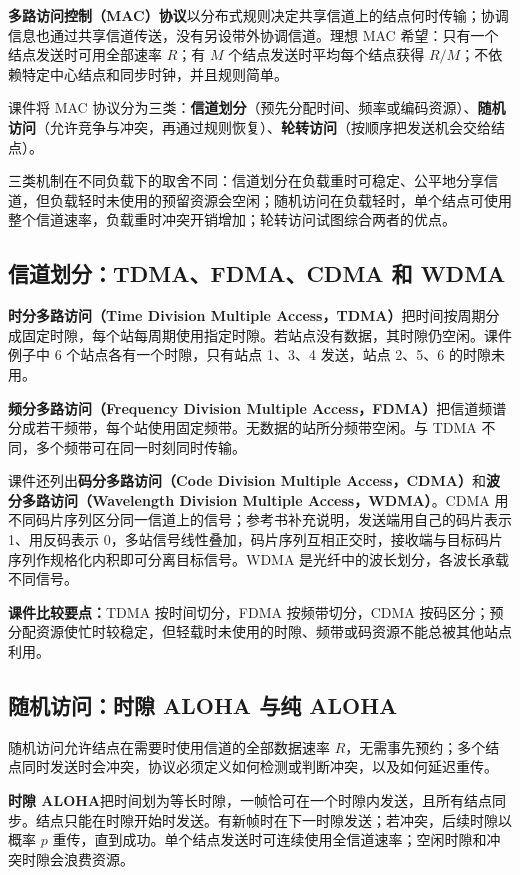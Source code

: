 \textbf{多路访问控制（MAC）协议}以分布式规则决定共享信道上的结点何时传输；协调信息也通过共享信道传送，没有另设带外协调信道。理想 MAC 希望：只有一个结点发送时可用全部速率 $R$；有 $M$ 个结点发送时平均每个结点获得 $R/M$；不依赖特定中心结点和同步时钟，并且规则简单。

课件将 MAC 协议分为三类：\textbf{信道划分}（预先分配时间、频率或编码资源）、\textbf{随机访问}（允许竞争与冲突，再通过规则恢复）、\textbf{轮转访问}（按顺序把发送机会交给结点）。

三类机制在不同负载下的取舍不同：信道划分在负载重时可稳定、公平地分享信道，但负载轻时未使用的预留资源会空闲；随机访问在负载轻时，单个结点可使用整个信道速率，负载重时冲突开销增加；轮转访问试图综合两者的优点。


\subsection{信道划分：TDMA、FDMA、CDMA 和 WDMA}
\textbf{时分多路访问（Time Division Multiple Access，TDMA）}把时间按周期分成固定时隙，每个站每周期使用指定时隙。若站点没有数据，其时隙仍空闲。课件例子中 6 个站点各有一个时隙，只有站点 1、3、4 发送，站点 2、5、6 的时隙未用。

\textbf{频分多路访问（Frequency Division Multiple Access，FDMA）}把信道频谱分成若干频带，每个站使用固定频带。无数据的站所分频带空闲。与 TDMA 不同，多个频带可在同一时刻同时传输。

课件还列出\textbf{码分多路访问（Code Division Multiple Access，CDMA）}和\textbf{波分多路访问（Wavelength Division Multiple Access，WDMA）}。CDMA 用不同码片序列区分同一信道上的信号；参考书补充说明，发送端用自己的码片表示 1、用反码表示 0，多站信号线性叠加，码片序列互相正交时，接收端与目标码片序列作规格化内积即可分离目标信号。WDMA 是光纤中的波长划分，各波长承载不同信号。

\textbf{课件比较要点：}TDMA 按时间切分，FDMA 按频带切分，CDMA 按码区分；预分配资源使忙时较稳定，但轻载时未使用的时隙、频带或码资源不能总被其他站点利用。


\subsection{随机访问：时隙 ALOHA 与纯 ALOHA}
随机访问允许结点在需要时使用信道的全部数据速率 $R$，无需事先预约；多个结点同时发送时会冲突，协议必须定义如何检测或判断冲突，以及如何延迟重传。

\textbf{时隙 ALOHA}把时间划为等长时隙，一帧恰可在一个时隙内发送，且所有结点同步。结点只能在时隙开始时发送。有新帧时在下一时隙发送；若冲突，后续时隙以概率 $p$ 重传，直到成功。单个结点发送时可连续使用全信道速率；空闲时隙和冲突时隙会浪费资源。

